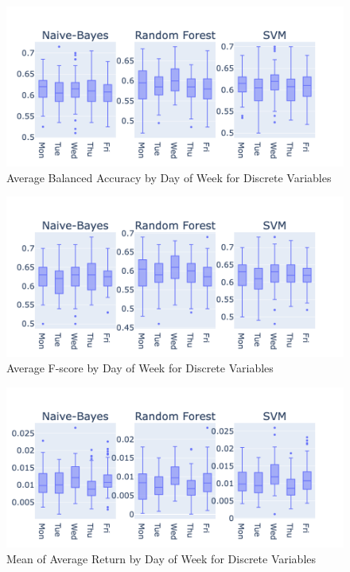 \documentclass[aodsor,preprint]{imsart}
\numberwithin{equation}{section}
\theoremstyle{plain}
\begin{document}
\begin{figure}[H]
  \centering
  \includegraphics[width=\textwidth]{plots/balanced_accuracy.png}
  \caption{Average Balanced Accuracy by Day of Week for Discrete Variables}
  \label{fig:plot8}
\end{figure}

\begin{figure}[H]
  \centering
  \includegraphics[width=\textwidth]{plots/f-score.png}
  \caption{Average F-score by Day of Week for Discrete Variables}
  \label{fig:plot9}
\end{figure}

\begin{figure}[H]
  \centering
  \includegraphics[width=\textwidth]{plots/avg_return.png}
  \caption{Mean of Average Return by Day of Week for Discrete Variables}
  \label{fig:plot10}
\end{figure}
\end{document}
